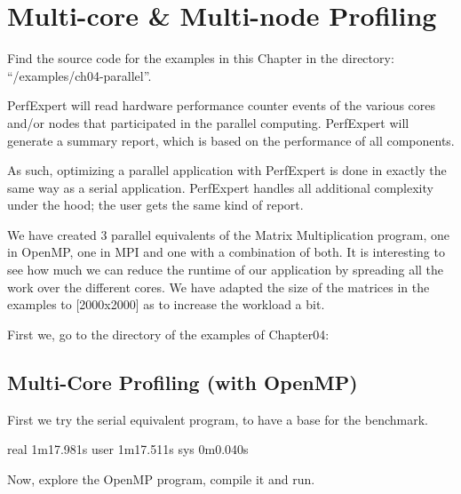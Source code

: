 \chapter{Multi-core \& Multi-node Profiling}
\label{ch:ch04_multi_core_multi_node_profiling}

\renewcommand{\exampledir}{examples/ch04-parallel}

\begin{tip}
Find the source code for the examples in this Chapter in the directory:  ``\tilde/\exampledir''.
\end{tip}

PerfExpert will read hardware performance counter events of the various cores and/or nodes that participated in the parallel computing. PerfExpert will generate a summary report, which is based on the performance of all components.

As such, optimizing a parallel application with PerfExpert is done in exactly the same way as a serial application. PerfExpert handles all additional complexity under the hood; the user gets the same kind of report.

We have created 3 parallel equivalents of the Matrix Multiplication program, one in OpenMP, one in MPI and one with a combination of both. It is interesting to see how much we can reduce the runtime of our application by spreading all the work over the different cores. We have adapted the size of the matrices in the examples to [2000x2000] as to increase the workload a bit.

First we, go to the directory of the examples of Chapter04:

\begin{prompt}
\end{prompt}

\section{Multi-Core Profiling (with OpenMP)}
\label{sec:Multi_core_profilingi_OpenMP}

First we try the serial equivalent program, to have a base for the benchmark.

\begin{prompt}
real 1m17.981s
user 1m17.511s
sys 0m0.040s
\end{prompt}

Now, explore the OpenMP program, compile it and run.

